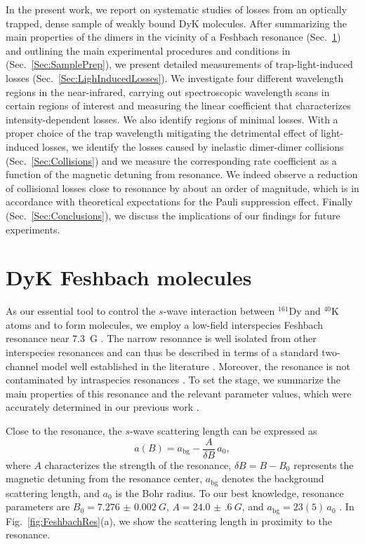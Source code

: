 In the present work, we report on systematic studies of losses from an optically trapped, dense sample of weakly bound DyK molecules. After summarizing the main properties of the dimers in the vicinity of a Feshbach resonance (Sec.~\ref{Sec:FeshbachMol}) and outlining the main experimental procedures and conditions in (Sec.~\ref{Sec:SamplePrep}), we present detailed measurements of trap-light-induced losses (Sec.~\ref{Sec:LighInducedLosses}). We investigate four different wavelength regions in the near-infrared, carrying out spectroscopic wavelength scans in certain regions of interest and measuring the linear coefficient that characterizes intensity-dependent losses. We also identify regions of minimal losses. With a proper choice of the trap wavelength mitigating the detrimental effect of light-induced losses, we identify the losses caused by inelastic dimer-dimer collisions (Sec.~\ref{Sec:Collisions}) and we measure the corresponding rate coefficient as a function of the magnetic detuning from resonance. We indeed observe a reduction of collisional losses close to resonance by about an order of magnitude, which is in accordance with theoretical expectations for the Pauli suppression effect. Finally (Sec.~\ref{Sec:Conclusions}), we discuss the implications of our findings for future experiments. 


\section{D\lowercase{y}K Feshbach molecules}
\label{Sec:FeshbachMol}

As our essential tool to control the $s$-wave interaction between $^{161}$Dy and $^{40}$K atoms and to form molecules, we employ a low-field interspecies Feshbach resonance near \SI{7.3}{G} \cite{Ye2022ool, Soave2023otf}. The narrow resonance is well isolated from other interspecies resonances and can thus be described in terms of a standard two-channel model well established in the literature \cite{Petrov2004tbp, Chin2010fri}. Moreover, the resonance is not contaminated by intraspecies resonances \cite{Ye2022ool}. To set the stage, we summarize the main properties of this resonance and the relevant parameter values, which were accurately determined in our previous work \cite{Ye2022ool, Soave2023otf}.

Close to the resonance, the $s$-wave scattering length can be expressed as 
\begin{equation}\label{Eq:scatteringLength}
	a(B)= a_{\mathrm{bg}}- \frac{A}{\delta B}\, a_0 ,
\end{equation}
where $A$ characterizes the strength of the resonance, $\delta B=B-B_0$ represents the magnetic detuning from the resonance center, $a_{\mathrm{bg}}$ denotes the background scattering length, and $a_0$ is the Bohr radius. To our best knowledge, resonance parameters are $B_0=\SI{7.276(2)}{G}$, $A=\SI{24.0(6)}{G}$, and $a_{\mathrm{bg}}=23(5)\,a_0$ \cite{Ye2022ool,Soave2023otf}. In Fig.~\ref{fig:FeshbachRes}(a), we show the scattering length in proximity to the resonance.

